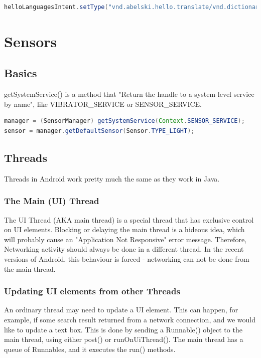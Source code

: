 \documentclass{article}
\begin{document}
\begin{code} \begin{lstlisting}[language=Java]
helloLanguagesIntent.setType("vnd.abelski.hello.translate/vnd.dictionary");
\end{lstlisting} \end{code}

\section{Sensors}

\subsection{Basics}

getSystemService() is a method that "Return the handle to a system-level service by name", like VIBRATOR\_SERVICE or SENSOR\_SERVICE.

\begin{code} \begin{lstlisting}[language=Java]
manager = (SensorManager) getSystemService(Context.SENSOR_SERVICE);
sensor = manager.getDefaultSensor(Sensor.TYPE_LIGHT);
\end{lstlisting} \end{code}


\subsection{Threads}
Threads in Android work pretty much the same as they work in Java.

\subsubsection{The Main (UI) Thread}
The UI Thread (AKA main thread) is a special thread that has exclusive control on UI elements. Blocking or delaying the main thread is a hideous idea, which will probably cause an "Application Not Responsive" error message. Therefore, Networking activity should always be done in a different thread. In the recent versions of Android, this behaviour is forced - networking can not be done from the main thread.

\subsubsection{Updating UI elements from other Threads}

An ordinary thread may need to update a UI element. This can happen, for example, if some search result returned from a network connection, and we would like to update a text box. This is done by sending a Runnable() object to the main thread, using either post() or runOnUiThread(). The main thread has a queue of Runnables, and it executes the run() methods.
\end{document}
